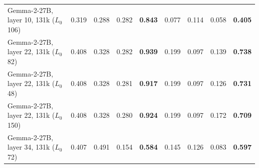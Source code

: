 \begin{tabular}{@{}lrrrrrrrr@{}}
Gemma-2-27B, layer 10, 131k ($L_0$ 106) & 0.319 & 0.288 & 0.282 & \textbf{0.843} & 0.077 & 0.114 & 0.058 & \textbf{0.405} \\
Gemma-2-27B, layer 22, 131k ($L_0$ 82) & 0.408 & 0.328 & 0.282 & \textbf{0.939} & 0.199 & 0.097 & 0.139 & \textbf{0.738} \\
Gemma-2-27B, layer 22, 131k ($L_0$ 48) & 0.408 & 0.328 & 0.281 & \textbf{0.917} & 0.199 & 0.097 & 0.126 & \textbf{0.731} \\
Gemma-2-27B, layer 22, 131k ($L_0$ 150) & 0.408 & 0.328 & 0.280 & \textbf{0.924} & 0.199 & 0.097 & 0.172 & \textbf{0.709} \\
Gemma-2-27B, layer 34, 131k ($L_0$ 72) & 0.407 & 0.491 & 0.154 & \textbf{0.584} & 0.145 & 0.126 & 0.083 & \textbf{0.597} \\
\bottomrule
\end{tabular}
